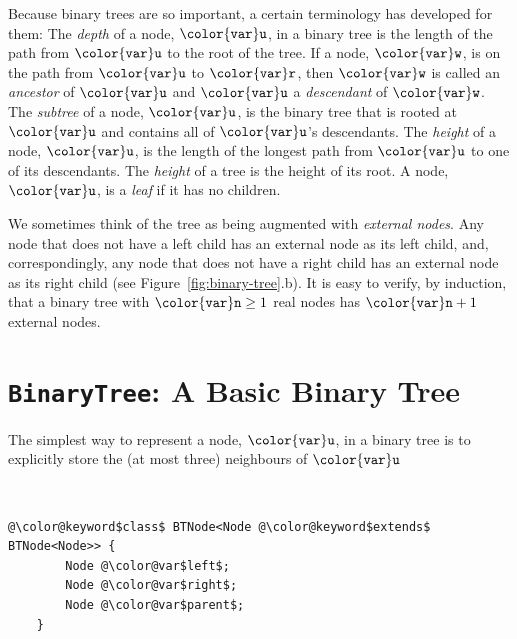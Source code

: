 \documentclass[10pt]{book}
\newcommand{\figref}[1]{Figure~\ref{fig:#1}}
\theoremstyle{plain}
\theoremstyle{definition}
\begin{document}
Because binary trees are so important, a certain terminology has developed
for them: The \emph{depth}
%
of a node, \ensuremath{\mathtt{{\color{var}u}}}, in a binary tree is the
length of the path from \ensuremath{\mathtt{{\color{var}u}}} to the root of the tree.   If a node, \ensuremath{\mathtt{{\color{var}w}}},
is on the path from \ensuremath{\mathtt{{\color{var}u}}} to \ensuremath{\mathtt{{\color{var}r}}}, then \ensuremath{\mathtt{{\color{var}w}}} is called an \emph{ancestor}
%
of \ensuremath{\mathtt{{\color{var}u}}} and \ensuremath{\mathtt{{\color{var}u}}} a \emph{descendant}
%
of \ensuremath{\mathtt{{\color{var}w}}}.  The \emph{subtree} of a
node, \ensuremath{\mathtt{{\color{var}u}}}, is the binary tree that is rooted at \ensuremath{\mathtt{{\color{var}u}}} and contains all
of \ensuremath{\mathtt{{\color{var}u}}}'s descendants.  The \emph{height}
 of a node, \ensuremath{\mathtt{{\color{var}u}}}, is the length
of the longest path from \ensuremath{\mathtt{{\color{var}u}}} to one of its descendants.  The \emph{height} of
%
a tree is the height of its root.
A node, \ensuremath{\mathtt{{\color{var}u}}}, is a \emph{leaf}
%
if it has no children.

We sometimes think of the tree as being augmented with \emph{external
nodes}. Any node that does not have a left child has an external
node as its left child, and, correspondingly, any node that does
not have a right child has an external node as its right child (see
\figref{binary-tree}.b).  It is easy to verify, by induction, that a
binary tree with $\ensuremath{\mathtt{{\color{var}n}}}\ge 1$ real nodes has $\ensuremath{\mathtt{{\color{var}n}}}+1$ external nodes.


\section{\texttt{BinaryTree}: A Basic Binary Tree}

%
The simplest way to represent a node, \ensuremath{\mathtt{{\color{var}u}}}, in a binary tree is to
explicitly store the (at most three) neighbours of \ensuremath{\mathtt{{\color{var}u}}}\notpcode{:}


 \ \vspace{.5ex}\begin{Verbatim}[gobble=1,tabsize=2,frame=single,framerule=1.2pt,commandchars=\\@\$,label=\texttt{BinaryTree},labelposition=topline]
	@\color@keyword$class$ BTNode<Node @\color@keyword$extends$ BTNode<Node>> {
		Node @\color@var$left$;
		Node @\color@var$right$;
		Node @\color@var$parent$;	
	}
\end{Verbatim}
\end{document}

